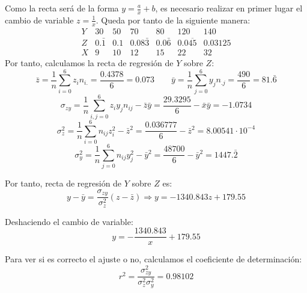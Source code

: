 \begin{ejercicio}
\begin{enumerate}
        Como la recta será de la forma $ y=\frac{a}{x}+b$, es necesario realizar en primer lugar el cambio de variable $z=\frac{1}{x}$. Queda por tanto de la siguiente manera:
        \begin{equation*}
            \begin{array}{c|cccccc}
                Y & 30 & 50 & 70 & 80 & 120 & 140 \\ \hline
                Z & 0.\bar{1} & 0.1 & 0.08\bar{3} & 0.0\bar{6} & 0.0\overline{45} & 0.03125 \\ \hline \hline
                X & 9 & 10 & 12 & 15 & 22 & 32
            \end{array}
        \end{equation*}
        Por tanto, calculamos la recta de regresión de $Y$ sobre $Z$:
        \begin{equation*}
            \bar{z} = \frac{1}{n}\sum_{i=0}^6 z_{i}n_{i.} = \frac{0.4378}{6} = 0.073
            \qquad
            \bar{y} = \frac{1}{n}\sum_{j=0}^6 y_{j}n_{.j} = \frac{490}{6} = 81.\bar{6}
        \end{equation*}
        \begin{equation*}
            \sigma_{zy} = \frac{1}{n}\sum_{i,j=0}^6 z_iy_j n_{ij} - \bar{z}\bar{y} = \frac{29.3295}{6} - \bar{x}\bar{y} = -1.0734
        \end{equation*}
        \begin{equation*}
            \sigma_z^2 = \frac{1}{n}\sum_{i=0}^6 n_{ij}z_i^2 - \bar{z}^2 = \frac{0.036777}{6} - \bar{z}^2 = 8.00541\cdot 10^{-4}
        \end{equation*}
        \begin{equation*}
            \sigma_y^2 = \frac{1}{n}\sum_{j=0}^6 n_{ij}y_j^2 - \bar{y}^2 = \frac{48700}{6} - \bar{y}^2 = 1447.\bar{2}
        \end{equation*}

        Por tanto, recta de regresión de $Y$ sobre $Z$ es:
        \begin{equation*}
            y-\bar{y} = \frac{\sigma_{zy}}{\sigma_z^2}(z-\bar{z}) \Longrightarrow y=-1340.843z +179.55
        \end{equation*}

        Deshaciendo el cambio de variable:
        \begin{equation*}
            y=-\frac{1340.843}{x} +179.55
        \end{equation*}
        
        Para ver si es correcto el ajuste o no, calculamos el coeficiente de determinación:
        \begin{equation*}
            r^2 = \frac{\sigma_{zy}^2}{\sigma_z^2 \sigma_y^2} = 0.98102
        \end{equation*}


\end{enumerate}
\end{ejercicio}

